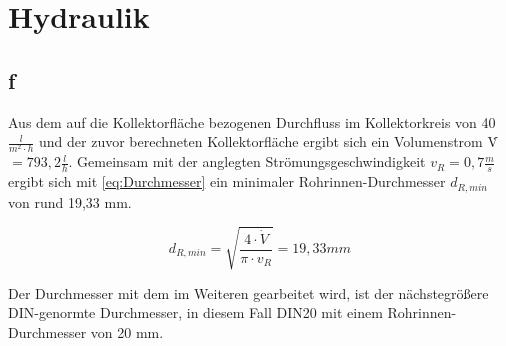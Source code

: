 \section{Hydraulik}
\label{sec:Hydraulik}
\subsection{f}
Aus dem auf die Kollektorfläche bezogenen Durchfluss im Kollektorkreis von 40 $\frac{l}{m^2\cdot h}$
und der zuvor berechneten Kollektorfläche ergibt sich ein Volumenstrom \.V $=793,2 \frac{l}{h}$.
Gemeinsam mit der anglegten Strömungsgeschwindigkeit $v_R = 0,7 \frac{m}{s}$ ergibt sich mit \autoref{eq:Durchmesser} \cite[S.42]{Sick22}
ein minimaler Rohrinnen-Durchmesser $d_{R,min}$ von rund 19,33 mm.

\begin{equation}
    d_{R,min}=\sqrt{\frac{4 \cdot \dot{V}}{\pi \cdot v_R}}=19,33 mm
    \label{eq:Durchmesser}
\end{equation}

Der Durchmesser mit dem im Weiteren gearbeitet wird, ist der nächstegrößere DIN-genormte Durchmesser,
in diesem Fall DIN20 mit einem Rohrinnen-Durchmesser von 20 mm.\\